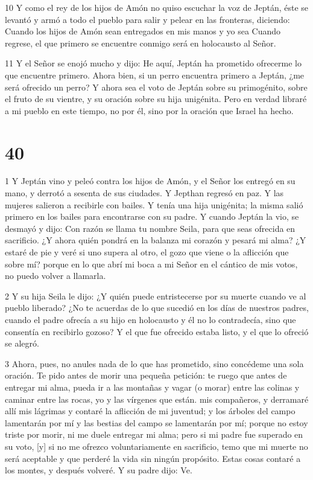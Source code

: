 \par 10 Y como el rey de los hijos de Amón no quiso escuchar la voz de Jeptán, éste se levantó y armó a todo el pueblo para salir y pelear en las fronteras, diciendo: Cuando los hijos de Amón sean entregados en mis manos y yo sea Cuando regrese, el que primero se encuentre conmigo será en holocausto al Señor.

\par 11 Y el Señor se enojó mucho y dijo: He aquí, Jeptán ha prometido ofrecerme lo que encuentre primero. Ahora bien, si un perro encuentra primero a Jeptán, ¿me será ofrecido un perro? Y ahora sea el voto de Jeptán sobre su primogénito, sobre el fruto de su vientre, y su oración sobre su hija unigénita. Pero en verdad libraré a mi pueblo en este tiempo, no por él, sino por la oración que Israel ha hecho.

\chapter{40}

\par 1 Y Jeptán vino y peleó contra los hijos de Amón, y el Señor los entregó en su mano, y derrotó a sesenta de sus ciudades. Y Jepthan regresó en paz. Y las mujeres salieron a recibirle con bailes. Y tenía una hija unigénita; la misma salió primero en los bailes para encontrarse con su padre. Y cuando Jeptán la vio, se desmayó y dijo: Con razón se llama tu nombre Seila, para que seas ofrecida en sacrificio. ¿Y ahora quién pondrá en la balanza mi corazón y pesará mi alma? ¿Y estaré de pie y veré si uno supera al otro, el gozo que viene o la aflicción que sobre mí? porque en lo que abrí mi boca a mi Señor en el cántico de mis votos, no puedo volver a llamarla.

\par 2 Y su hija Seila le dijo: ¿Y quién puede entristecerse por su muerte cuando ve al pueblo liberado? ¿No te acuerdas de lo que sucedió en los días de nuestros padres, cuando el padre ofrecía a su hijo en holocausto y él no lo contradecía, sino que consentía en recibirlo gozoso? Y el que fue ofrecido estaba listo, y el que lo ofreció se alegró.

\par 3 Ahora, pues, no anules nada de lo que has prometido, sino concédeme una sola oración. Te pido antes de morir una pequeña petición: te ruego que antes de entregar mi alma, pueda ir a las montañas y vagar (o morar) entre las colinas y caminar entre las rocas, yo y las vírgenes que están. mis compañeros, y derramaré allí mis lágrimas y contaré la aflicción de mi juventud; y los árboles del campo lamentarán por mí y las bestias del campo se lamentarán por mí; porque no estoy triste por morir, ni me duele entregar mi alma; pero si mi padre fue superado en su voto, [y] si no me ofrezco voluntariamente en sacrificio, temo que mi muerte no será aceptable y que perderé la vida sin ningún propósito. Estas cosas contaré a los montes, y después volveré. Y su padre dijo: Ve.

